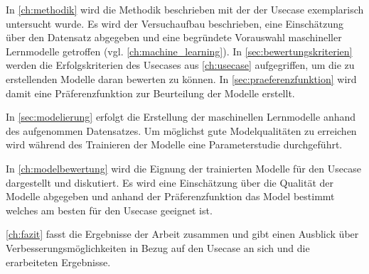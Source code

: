 In \cref{ch:methodik} wird die Methodik beschrieben mit der der Usecase exemplarisch untersucht wurde. Es wird der Versuchaufbau beschrieben, eine Einschätzung über den Datensatz abgegeben und eine begründete Vorauswahl maschineller Lernmodelle getroffen (vgl. \cref{ch:machine_learning}). In \cref{sec:bewertungskriterien} werden die Erfolgskriterien des Usecases aus \cref{ch:usecase} aufgegriffen, um die zu erstellenden Modelle daran bewerten zu können. In \cref{sec:praeferenzfunktion} wird damit eine Präferenzfunktion zur Beurteilung der Modelle erstellt.

In \cref{sec:modelierung} erfolgt die Erstellung der maschinellen Lernmodelle anhand des aufgenommen Datensatzes. Um möglichst gute Modelqualitäten zu erreichen wird während des Trainieren der Modelle eine Parameterstudie durchgeführt.

In \cref{ch:modelbewertung} wird die Eignung der trainierten Modelle für den Usecase dargestellt und diskutiert. Es wird eine Einschätzung über die Qualität der Modelle abgegeben und anhand der Präferenzfunktion das Model bestimmt welches am besten für den Usecase geeignet ist.

\cref{ch:fazit} fasst die Ergebnisse der Arbeit zusammen und gibt einen Ausblick über Verbesserungsmöglichkeiten in Bezug auf den Usecase an sich und die erarbeiteten Ergebnisse.